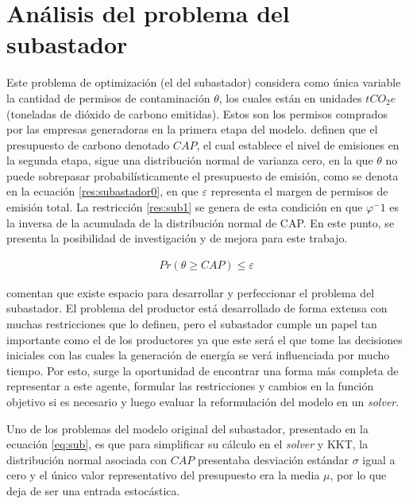 \section{Análisis del problema del subastador}

Este problema de optimización (el del subastador) considera como única variable la cantidad de permisos de contaminación $\theta$, los cuales están en unidades $tCO_2 e$ (toneladas de dióxido de carbono emitidas). Estos son los permisos comprados por las empresas generadoras en la primera etapa del modelo.  definen que el presupuesto de carbono denotado $CAP$, el cual establece el nivel de emisiones en la segunda etapa, sigue una distribución normal de varianza cero, en la que $\theta$ no puede sobrepasar probabilísticamente el presupuesto de emisión, como se denota en la ecuación \ref{res:subastador0}, en que $\varepsilon$ representa el margen de permisos de emisión total. La restricción \ref{res:sub1} se genera de esta condición en que $\varphi^-1$ es la inversa de la acumulada de la distribución normal de CAP. En este punto, se presenta la posibilidad de investigación y de  mejora para este trabajo. 
\vspace{2.5mm}

\begin{equation}
\begin{array}{cl}
    Pr(\theta \geq CAP)\leq \varepsilon \label{res:subastador0}
\end{array}
\end{equation}
\vspace{2.5mm}

 comentan que existe espacio para desarrollar y perfeccionar el problema del subastador. El problema del productor está desarrollado de forma extensa con muchas restricciones que lo definen, pero el subastador cumple un papel tan importante como el de los productores ya que este será el que tome las decisiones iniciales con las cuales la generación de energía se verá influenciada por mucho tiempo.  Por esto, surge la oportunidad de encontrar una forma más completa de representar a este agente, formular las restricciones y cambios en la función objetivo si es necesario y luego evaluar la reformulación del modelo en un \textit{solver}.
\vspace{2.5mm}

Uno de los problemas del modelo original del subastador, presentado en la ecuación \ref{eq:sub}, es que para simplificar su cálculo en el \textit{solver} y KKT, la distribución normal asociada con $CAP$ presentaba desviación estándar $\sigma$ igual a cero y el único valor representativo del presupuesto era la media $\mu$, por lo que deja de ser una entrada estocástica. 
\vspace{2.5mm}

